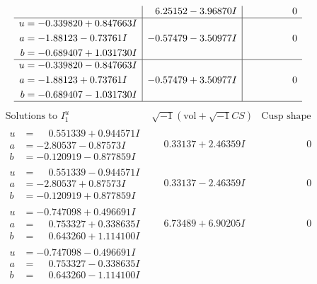 \documentclass[1p]{elsarticle_modified}
\theoremstyle{definition}
\newcommand{\I}{\sqrt{-1}}
\begin{document}
$$\begin{array}{c|c|c}
 & \phantom{-}6.25152 - 3.96870 I & \phantom{-0.000000 } 0 \\ \hline\begin{aligned}
u &= -0.339820 + 0.847663 I \\
a &= -1.88123 - 0.73761 I \\
b &= -0.689407 + 1.031730 I\end{aligned}
 & -0.57479 - 3.50977 I & \phantom{-0.000000 } 0 \\ \hline\begin{aligned}
u &= -0.339820 - 0.847663 I \\
a &= -1.88123 + 0.73761 I \\
b &= -0.689407 - 1.031730 I\end{aligned}
 & -0.57479 + 3.50977 I & \phantom{-0.000000 } 0\\
 \hline 
 \end{array}$$\newpage$$\begin{array}{c|c|c}  
\text{Solutions to }I^u_{1}& \I (\text{vol} + \sqrt{-1}CS) & \text{Cusp shape}\\
 \hline 
\begin{aligned}
u &= \phantom{-}0.551339 + 0.944571 I \\
a &= -2.80537 - 0.87573 I \\
b &= -0.120919 - 0.877859 I\end{aligned}
 & \phantom{-}0.33137 + 2.46359 I & \phantom{-0.000000 } 0 \\ \hline\begin{aligned}
u &= \phantom{-}0.551339 - 0.944571 I \\
a &= -2.80537 + 0.87573 I \\
b &= -0.120919 + 0.877859 I\end{aligned}
 & \phantom{-}0.33137 - 2.46359 I & \phantom{-0.000000 } 0 \\ \hline\begin{aligned}
u &= -0.747098 + 0.496691 I \\
a &= \phantom{-}0.753327 + 0.338635 I \\
b &= \phantom{-}0.643260 + 1.114100 I\end{aligned}
 & \phantom{-}6.73489 + 6.90205 I & \phantom{-0.000000 } 0 \\ \hline\begin{aligned}
u &= -0.747098 - 0.496691 I \\
a &= \phantom{-}0.753327 - 0.338635 I \\
b &= \phantom{-}0.643260 - 1.114100 I\end{aligned}

\end{array}$$
\end{document}

